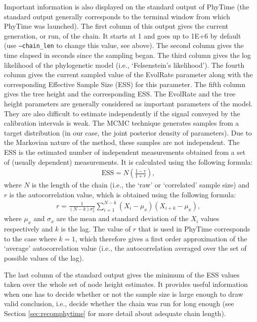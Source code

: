 \documentclass[a4paper,12pt]{article}
\newcommand{\x}[1]{\texttt{#1}}
\begin{document}
Important  information is also  displayed on  the standard  output of  PhyTime (the  standard output
generally corresponds to the terminal window from  which PhyTime was launched).  The first column of
this output gives the current  generation, or run, of the chain. It starts at  1 and goes up to 1E+6
by default (use \x{--chain\_len} to change this value, see above).  The second column gives the time
elapsed  in seconds since  the sampling  began. The  third column  gives the  log likelihood  of the
phylogenetic model (i.e.,  `Felsenstein's likelihood'). The fourth column  gives the current sampled
value of the  EvolRate parameter along with  the corresponding Effective Sample Size  (ESS) for this
parameter.  The fifth column  gives the tree height and the corresponding  ESS. The EvolRate and the
tree height parameters are generally considered as  important parameters of the model. They are also
difficult to  estimate independently if  the signal conveyed  by the calibration intervals  is weak.
The MCMC technique  generates samples from a  target distribution (in our case,  the joint posterior
density  of  parameters).  Due  to  the  Markovian  nature of  the  method,  these samples  are  not
independent.  The  ESS is the estimated  number of independent  measurements obtained from a  set of
(usually dependent) measurements. It is calculated using the following formula:
\begin{eqnarray*}
\mathrm{ESS} = N\left(\frac{1-r}{1+r}\right),
\end{eqnarray*}
where  $N$  is the  length  of  the  chain  (i.e., the  `raw'  or `correlated' sample  size)  and $r$  is  the
autocorrelation value, which is obtained using the following formula:
\begin{eqnarray*}
r = \frac{1}{(N-k)\sigma_x^2} \sum_{i=1}^{N-k} (X_i - \mu_x)(X_{i+k}-\mu_x),
\end{eqnarray*} where $\mu_x$ and $\sigma_x$ are the mean and standard deviation of the $X_i$ values
respectively and $k$ is the lag. The value of $r$ that is used in PhyTime corresponds to the case where $k=1$,
which therefore gives a first order  approximation of the `average' autocorrelation value (i.e., the
autocorrelation averaged over the set of possible values of the lag).

The last column of the standard output gives the  minimum of the ESS values taken over the whole set
of node height estimates.  It provides useful information when one has to  decide whether or not the
sample size  is large enough to  draw valid conclusion, i.e.,  decide whether the chain  was run for
long enough (see Section \ref{sec:recomphytime} for more detail about adequate chain length).
\end{document}

